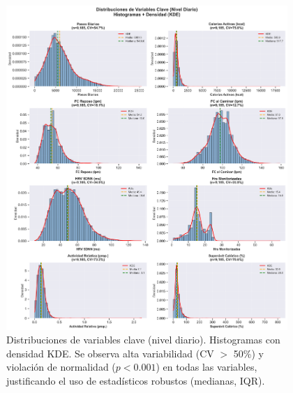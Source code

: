 \documentclass[12pt,letterpaper,twoside]{report}
\begin{document}
\begin{figure}[htbp]
\centering
\includegraphics[width=0.95\textwidth]{../analisis_u/descriptivos_visuales/histogramas_con_kde.png}
\caption{Distribuciones de variables clave (nivel diario). Histogramas con densidad KDE. Se observa alta variabilidad (CV $>$ 50\%) y violación de normalidad ($p < 0.001$) en todas las variables, justificando el uso de estadísticos robustos (medianas, IQR).}
\label{fig:histogramas_kde}
\end{figure}
\end{document}
